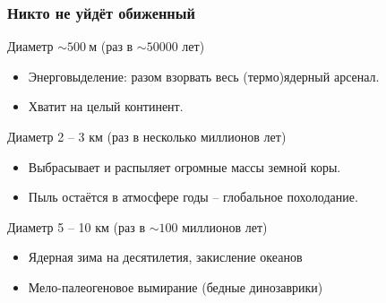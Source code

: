\documentclass[aspectratio=169]{beamer}
\begin{document}
\begin{frame}
\frametitle{Никто не уйдёт обиженный}

\begin{block}{Диаметр $\sim 500 \: \mathrm{\text{м}}$ (раз в $\sim 50000$ лет)}
\begin{itemize}
\item Энерговыделение: разом взорвать весь (термо)ядерный арсенал.
\item Хватит на целый континент.
\end{itemize}
\end{block}

\begin{block}{Диаметр 2 -- 3 км (раз в несколько миллионов лет)}
\begin{itemize}
\item Выбрасывает и распыляет огромные массы земной коры.
\item Пыль остаётся в атмосфере годы -- глобальное похолодание.
\end{itemize}
\end{block}

\begin{block}{Диаметр 5 -- 10 км (раз в $\sim 100$ миллионов лет)}
\begin{itemize}
\item Ядерная зима на десятилетия, закисление океанов
\item Мело-палеогеновое вымирание (бедные динозаврики)
\end{itemize}
\end{block}
\end{frame}
\end{document}
